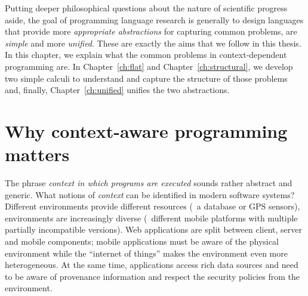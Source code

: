 Putting deeper philosophical questions about the nature of scientific prog\-ress aside,
the goal of programming language research is generally to design languages that provide
more \emph{appropriate abstractions} for capturing common problems, are \emph{simple} and
more \emph{unified}. These are exactly the aims that we follow in this thesis. In this chapter, 
we explain what the common problems in context-dependent programming are. In 
Chapter~\ref{ch:flat} and Chapter~\ref{ch:structural}, we develop two simple calculi to 
understand and capture the structure of those problems and, finally, Chapter~\ref{ch:unified} 
unifies the two abstractions.



%                                                                                             


\section{Why context-aware programming matters}
\label{sec:intro-whymatters}

The phrase \emph{context in which programs are executed} sounds rather abstract and generic.
What notions of \emph{context} can be identified in modern software systems?
Different environments provide different resources (\eg~a database or GPS sensors), environments 
are increasingly diverse (\eg~different mobile platforms with multiple partially incompatible versions). 
Web applications are split between client, server and mobile components; mobile
applications must be aware of the physical environment while the ``internet of things'' makes
the environment even more heterogeneous. At the same time, applications access
rich data sources and need to be aware of provenance information and respect the security policies 
from the environment.

